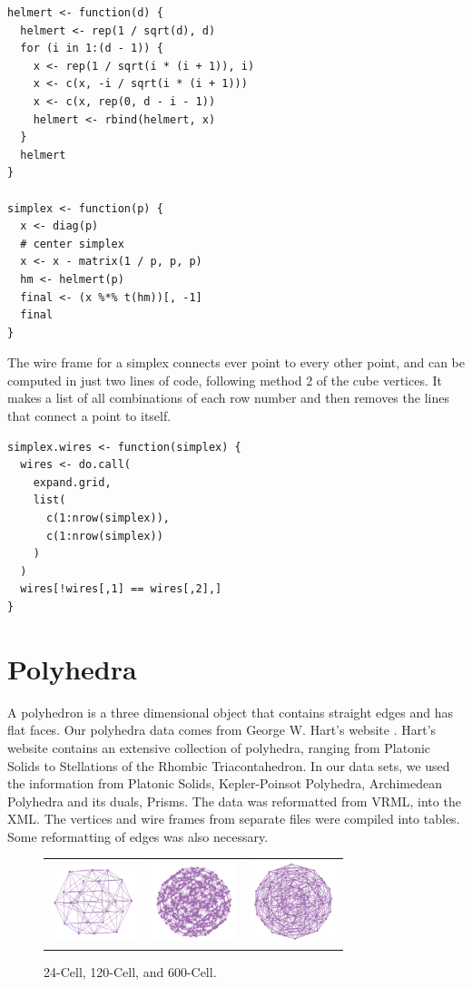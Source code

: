\begin{verbatim}
helmert <- function(d) {
  helmert <- rep(1 / sqrt(d), d)
  for (i in 1:(d - 1)) {
    x <- rep(1 / sqrt(i * (i + 1)), i)
    x <- c(x, -i / sqrt(i * (i + 1)))
    x <- c(x, rep(0, d - i - 1))
    helmert <- rbind(helmert, x)
  }
  helmert
}

simplex <- function(p) {
  x <- diag(p)
  # center simplex
  x <- x - matrix(1 / p, p, p)
  hm <- helmert(p)
  final <- (x %*% t(hm))[, -1]
  final
}
\end{verbatim}

The wire frame for a simplex connects ever point to every other point, and can
be computed in just two lines of code, following method 2 of the cube
vertices. It makes a list of all combinations of each row number and then
removes the lines that connect a point to itself.

\begin{verbatim}
simplex.wires <- function(simplex) {
  wires <- do.call(
    expand.grid,
    list(
      c(1:nrow(simplex)),
      c(1:nrow(simplex))
    )
  )
  wires[!wires[,1] == wires[,2],]
}
\end{verbatim}

\section{Polyhedra}

A polyhedron is a three dimensional object that contains straight
edges and has flat faces. Our polyhedra data comes from George
W. Hart's website \citep{GeorgeVP}. Hart's website contains an
extensive collection of polyhedra, ranging from Platonic Solids to
Stellations of the Rhombic Triacontahedron. In our data sets, we used
the information from Platonic Solids, Kepler-Poinsot Polyhedra,
Archimedean Polyhedra and its duals, Prisms. The data was reformatted
from VRML, into the XML. The vertices and wire frames from separate
files were compiled into tables. Some reformatting of edges was also
necessary.

\begin{figure}[ht]
\centering
\begin{tabular}{ccc}
\includegraphics[width=1.0in]{fig/24-cell.pdf}&\includegraphics[width=1in]{fig/120-cell.pdf}&\includegraphics[width=1in]{fig/600-cell.pdf}
\end{tabular}
\caption{24-Cell, 120-Cell, and 600-Cell.}
\end{figure}

